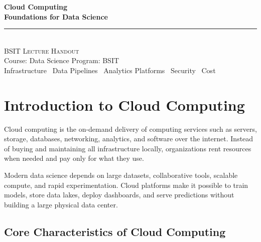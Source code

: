 \documentclass[11pt,a4paper]{article}
\begin{document}
\begin{center}
\vspace*{0.5cm}
{\Huge\bfseries\textcolor{primary}{Cloud Computing}}\\[8pt]
{\Huge\bfseries\textcolor{primary}{Foundations for Data Science}}\\[16pt]
{\color{secondary}\rule{0.68\textwidth}{1.5pt}}\\[12pt]
{\Large\textsc{BSIT Lecture Handout}}\\[6pt]
{\large\textcolor{gray!70!black}{Course: Data Science \quad Program: BSIT}}\\[8pt]
{\normalsize\textcolor{gray!70!black}{Infrastructure \textbullet\ Data Pipelines \textbullet\ Analytics Platforms \textbullet\ Security \textbullet\ Cost}}
\vspace{0.3cm}
\end{center}

\tableofcontents
\newpage

\section{Introduction to Cloud Computing}

\begin{definitionbox}
Cloud computing is the on-demand delivery of computing services such as servers, storage, databases, networking, analytics, and software over the internet. Instead of buying and maintaining all infrastructure locally, organizations rent resources when needed and pay only for what they use.
\end{definitionbox}

\begin{conceptbox}
Modern data science depends on large datasets, collaborative tools, scalable compute, and rapid experimentation. Cloud platforms make it possible to train models, store data lakes, deploy dashboards, and serve predictions without building a large physical data center.
\end{conceptbox}

\subsection{Core Characteristics of Cloud Computing}
\end{document}
